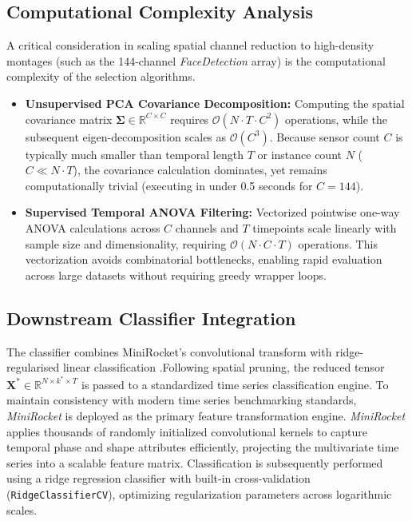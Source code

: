 \subsection{Computational Complexity Analysis}
\noindent
A critical consideration in scaling spatial channel reduction to high-density montages (such as the 144-channel \textit{FaceDetection} array) is the computational complexity of the selection algorithms. 
\begin{itemize}
    \item \textbf{Unsupervised PCA Covariance Decomposition:} Computing the spatial covariance matrix $\mathbf{\Sigma} \in \mathbb{R}^{C \times C}$ requires $\mathcal{O}(N \cdot T \cdot C^2)$ operations, while the subsequent eigen-decomposition scales as $\mathcal{O}(C^3)$. Because sensor count $C$ is typically much smaller than temporal length $T$ or instance count $N$ ($C \ll N \cdot T$), the covariance calculation dominates, yet remains computationally trivial (executing in under 0.5 seconds for $C=144$).
    \item \textbf{Supervised Temporal ANOVA Filtering:} Vectorized pointwise one-way ANOVA calculations across $C$ channels and $T$ timepoints scale linearly with sample size and dimensionality, requiring $\mathcal{O}(N \cdot C \cdot T)$ operations. This vectorization avoids combinatorial bottlenecks, enabling rapid evaluation across large datasets without requiring greedy wrapper loops.
\end{itemize}

\subsection{Downstream Classifier Integration}
\noindent
The classifier combines MiniRocket's convolutional transform
\citep{dempster2021minirocket} with ridge-regularised linear classification
\citep{hoerl1970ridge}.Following spatial pruning, the reduced tensor $\mathbf{X}^* \in \mathbb{R}^{N \times k^* \times T}$ is passed to a standardized time series classification engine. To maintain consistency with modern time series benchmarking standards, \textit{MiniRocket} is deployed as the primary feature transformation engine. \textit{MiniRocket} applies thousands of randomly initialized convolutional kernels to capture temporal phase and shape attributes efficiently, projecting the multivariate time series into a scalable feature matrix. Classification is subsequently performed using a ridge regression classifier with built-in cross-validation (\texttt{RidgeClassifierCV}), optimizing regularization parameters across logarithmic scales.

